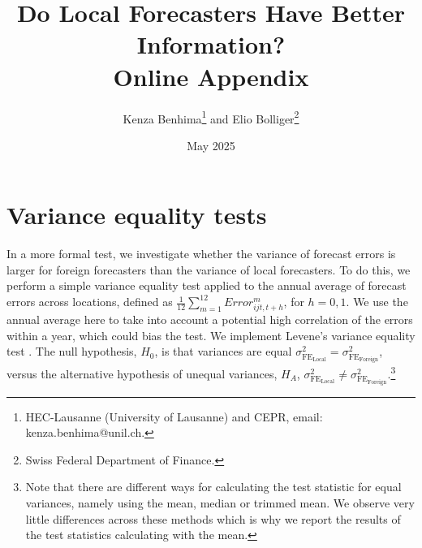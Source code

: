 \documentclass[letterpaper,12pt]{article}
\title{Do Local Forecasters Have Better Information?\\
	Online Appendix}
\author{Kenza Benhima\footnote{HEC-Lausanne (University of Lausanne) and CEPR, email: kenza.benhima@unil.ch.} and Elio Bolliger\footnote{Swiss Federal Department of Finance.} }
\date{May 2025}
\begin{document}
\vspace{-1cm}
\maketitle

\tableofcontents 


\newpage

\setcounter{page}{1}

\appendix



\section{Variance equality tests}
\label{app:sec:variance}

In a more formal test, we investigate whether the variance of forecast errors is larger for foreign forecasters than the variance of local forecasters. To do this, we perform a simple variance equality test applied to the annual average of forecast errors across locations, defined as $\frac{1}{12}\sum_{m=1}^{12} Error_{ijt,t+h}^m$, for $h=0,1$. We use the annual average here to take into account a potential high correlation of the errors within a year, which could bias the test. We implement Levene’s variance equality test \citep{levene1960robust}. The null hypothesis, $H_0$, is that variances are equal $\sigma^2_{\text{FE}_{\text{Local}}} = \sigma^2_{\text{FE}_{\text{Foreign}}}$, versus the alternative hypothesis of unequal variances,  $H_A$, $\sigma^2_{\text{FE}_{\text{Local}}} \neq \sigma^2_{\text{FE}_{\text{Foreign}}}$.\footnote{Note that there are different ways for calculating the test statistic for equal variances, namely using the mean, median or trimmed mean. We observe very little differences across these methods which is why we report the results of the test statistics calculating with the mean.}



{

}
\end{document}
